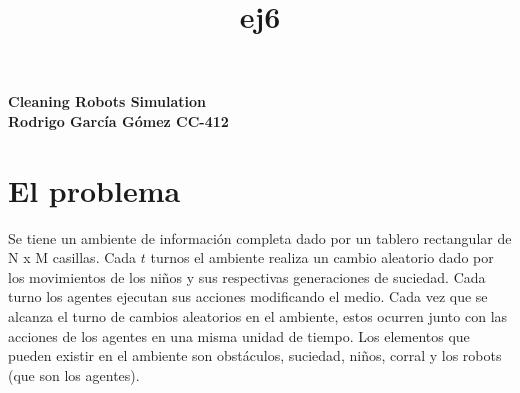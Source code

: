 \documentclass[a4paper,12pt]{article}
\begin{document}
 

\title{ej6}

\begin{titlepage}
\centering
\vspace*{\fill}
\vspace*{0.5cm}
\huge\bfseries
Cleaning Robots Simulation\\
\vspace*{0.5cm}
\large Rodrigo García Gómez CC-412
\vspace*{\fill}
\end{titlepage}

\section*{El problema}
Se tiene un ambiente de información completa dado por un tablero rectangular de N x M casillas. Cada $t$ turnos el ambiente realiza un cambio aleatorio dado por los movimientos de los niños y sus respectivas generaciones de suciedad. Cada turno los agentes ejecutan sus acciones modificando el medio. Cada vez que se alcanza el turno de cambios aleatorios en el ambiente, estos ocurren junto con las acciones de los agentes en una misma unidad de tiempo. Los elementos que pueden existir en el ambiente son obstáculos, suciedad, niños, corral y los robots (que son los agentes).
\end{document}
